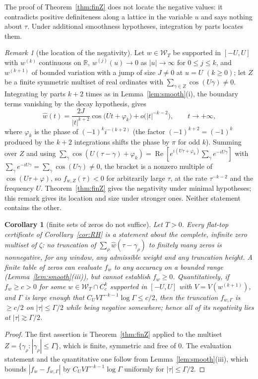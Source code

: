 \documentclass[11pt]{amsart}
\newtheorem{corollary}[theorem]{Corollary}
\theoremstyle{definition}
\theoremstyle{remark}
\newtheorem{remark}[theorem]{Remark}
\newcommand{\R}{\mathbb R}
\newcommand{\Rel}{\operatorname{Re}}
\newcommand{\wh}{\widehat w}
\newcommand{\Wcl}{\mathcal W_T}
\begin{document}
The proof of Theorem~\ref{thm:finZ} does not locate the negative values: it contradicts positive
definiteness along a lattice in the variable $u$ and says nothing about $\tau$. Under additional
smoothness hypotheses, integration by parts locates them.

\begin{remark}[the location of the negativity]\label{rem:loc}
Let $w\in\Wcl$ be supported in $[-U,U]$ with $w^{(k)}$ continuous on $\R$, $w^{(j)}(u)\to0$ as
$|u|\to\infty$ for $0\le j\le k$, and $w^{(k+1)}$ of bounded variation with a jump of size $J\ne0$
at $u=U$ $(k\ge0)$; let $Z$ be a finite symmetric multiset of real ordinates with
$\sum_{\gamma\in Z}\cos(U\gamma)\ne0$. Integrating by parts $k+2$ times as in
Lemma~\ref{lem:smooth}(i), the boundary terms vanishing by the decay hypothesis, gives
\[
\wh(t)=\frac{2J}{|t|^{k+2}}\cos\big(Ut+\varphi_k\big)+o\big(|t|^{-k-2}\big),\qquad t\to+\infty,
\]
where $\varphi_k$ is the phase of $(-1)^ki^{-(k+2)}$ (the factor $(-1)^{k+2}=(-1)^k$ produced by
the $k+2$ integrations shifts the phase by $\pi$ for odd $k$). Summing over $Z$ and using
$\sum_\gamma\cos(U(\tau-\gamma)+\varphi_k)=\Rel[e^{i(U\tau+\varphi_k)}\sum_\gamma e^{-iU\gamma}]$
with $\sum_\gamma e^{-iU\gamma}=\sum_\gamma\cos(U\gamma)\ne0$, the bracket is a nonzero multiple of
$\cos(U\tau+\varphi)$, so $f_{w,Z}(\tau)<0$ for arbitrarily large $\tau$, at the rate $\tau^{-k-2}$
and the frequency $U$. Theorem~\ref{thm:finZ} gives the negativity under minimal hypotheses; this
remark gives its location and size under stronger ones. Neither statement contains the other.
\end{remark}

\begin{corollary}[finite sets of zeros do not suffice]\label{cor:infinite}
Let $T>0$. Every flat-top certificate of Corollary~\ref{cor:RH} is a statement about the complete,
infinite zero multiset of $\zeta$: no truncation of $\sum_\rho\wh(\tau-\gamma_\rho)$ to finitely many
zeros is nonnegative, for any window, any admissible weight and any truncation height. A finite
table of zeros can evaluate $f_w$ to any accuracy on a bounded range (Lemma~\ref{lem:smooth}(iii)),
but cannot establish $f_w\ge0$. Quantitatively, if $f_w\ge c>0$ for some $w\in\Wcl\cap C_c^k$
supported in $[-U,U]$ with $V=V(w^{(k+1)})$, and $\Gamma$ is large enough that
$C_UV\Gamma^{-k-1}\log\Gamma\le c/2$, then the truncation $f_{w,\Gamma}$ is $\ge c/2$ on
$|\tau|\le\Gamma/2$ while being negative somewhere; hence all of its negativity lies at
$|\tau|\gtrsim\Gamma/2$.
\end{corollary}
\begin{proof}
The first assertion is Theorem~\ref{thm:finZ} applied to the multiset
$Z=\{\gamma_\rho:|\gamma_\rho|\le\Gamma\}$, which is finite, symmetric and free of $0$. The
evaluation statement and the quantitative one follow from Lemma~\ref{lem:smooth}(iii), which bounds
$|f_w-f_{w,\Gamma}|$ by $C_UV\Gamma^{-k-1}\log\Gamma$ uniformly for $|\tau|\le\Gamma/2$.
\end{proof}
\end{document}
